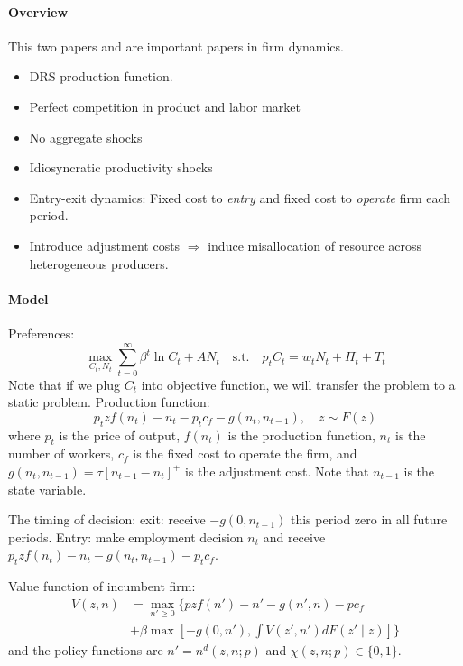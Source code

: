 \documentclass[11pt,a4paper]{article}
\begin{document}
\paragraph{Overview} This two papers \citet{hopenhayn1992entry} and \citet{hopenhayn1993job} are important papers in firm dynamics. 
\begin{itemize}
  \item DRS production function. 
  \item Perfect competition in product and labor market
  \item No aggregate shocks
  \item Idiosyncratic productivity shocks
  \item Entry-exit dynamics: Fixed cost to \textit{entry} and fixed cost to \textit{operate} firm each period.
  \item Introduce adjustment costs $\Rightarrow$ induce misallocation of resource across heterogeneous producers. 
\end{itemize}
\paragraph{Model}Preferences: $$ \max_{C_t,N_t}\sum_{t=0}^\infty \beta^t \ln C_t + A N_t\quad\text{s.t.} \quad p_t C_t = w_t N_t + \Pi_t + T_t $$ Note that if we plug $C_t$ into objective function, we will transfer the problem to a static problem. 
Production function: \begin{equation}
  p_t z f(n_t) - n_t - p_t c_f - g(n_t,n_{t-1}),\quad z \sim F(z)
\end{equation}
where $p_t$ is the price of output, $f(n_t)$ is the production function, $n_t$ is the number of workers, $c_f$ is the fixed cost to operate the firm, and $g(n_t,n_{t-1}) = \tau[n_{t-1}-n_{t}]^+$ is the adjustment cost. Note that $n_{t-1}$ is the state variable. 

The timing of decision: exit: receive $-g(0,n_{t-1})$ this period zero in all future periods. Entry: make employment decision $n_t$ and receive $p_t z f(n_t)-n_t -g(n_t,n_{t-1})-p_t c_f$. 

Value function of incumbent firm:
\begin{equation}
  \begin{aligned}
  V(z,n) &= \max_{n'\geq 0} \bigg\{p z f(n') - n'  - g(n',n)- p c_f \\ &+ \beta \max[-g(0,n'),\int V(z',n')d F(z'\mid z)] \bigg\}
  \end{aligned}
\end{equation}
and the policy functions are $n' = n^d (z,n;p)$ and $\chi(z,n;p)\in \{0,1\}$. 
\end{document}
